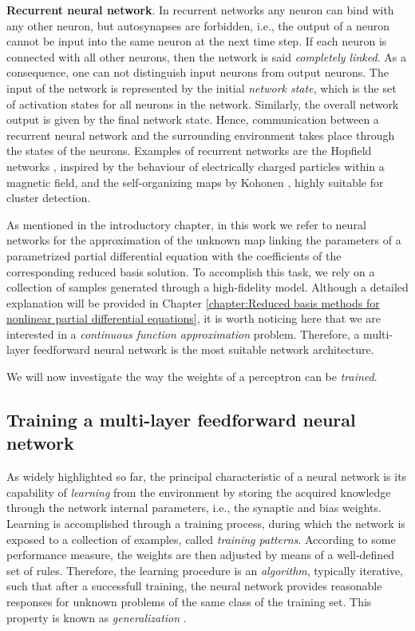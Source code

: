 \documentclass[12pt, a4paper, twoside, openright, notitlepage]{report}
\numberwithin{equation}{chapter}
\theoremstyle{theorem}
\theoremstyle{definition}
\theoremstyle{remark}
\theoremstyle{proposition}
\numberwithin{figure}{chapter}
\begin{document}
		\noindent \textbf{Recurrent neural network}. In recurrent networks any neuron can bind with any other neuron, but autosynapses are forbidden, i.e., the output of a neuron cannot be input into the same neuron at the next time step. If each neuron is connected with all other neurons, then the network is said \emph{completely linked}. As a consequence, one can not distinguish input neurons from output neurons. The input of the network is represented by the initial \emph{network state}, which is the set of activation states for all neurons in the network. Similarly, the overall network output is given by the final network state. Hence, communication between a recurrent neural network and the surrounding environment takes place through the states of the neurons. Examples of recurrent networks are the Hopfield networks \cite{Hop82}, inspired by the behaviour of electrically charged particles within a magnetic field, and the self-organizing maps by Kohonen \cite{Koh98}, highly suitable for cluster detection.
		
		\vspace*{0.3cm}
		
		As mentioned in the introductory chapter, in this work we refer to neural networks for the approximation of the unknown map linking the parameters of a parametrized partial differential equation with the coefficients of the corresponding reduced basis solution. To accomplish this task, we rely on a collection of samples generated through a high-fidelity model. Although a detailed explanation will be provided in Chapter \ref{chapter:Reduced basis methods for nonlinear partial differential equations}, it is worth noticing here that we are interested in a \emph{continuous function approximation} problem. Therefore, a multi-layer feedforward neural network is the most suitable network architecture. 
		
		We will now investigate the way the weights of a perceptron can be \emph{trained}.
		
	\vspace*{0.3cm}
		
	\subsection{Training a multi-layer feedforward neural network}
	\label{section:Training a multi-layer feedforward neural network}
	
		As widely highlighted so far, the principal characteristic of a neural network is its capability of \emph{learning} from the environment by storing the acquired knowledge through the network internal parameters, i.e., the synaptic and bias weights. Learning is accomplished through a training process, during which the network is exposed to a collection of examples, called \emph{training patterns}. According to some performance measure, the weights are then adjusted by means of a well-defined set of rules. Therefore, the learning procedure is an \emph{algorithm}, typically iterative, such that after a successfull training, the neural network provides reasonable responses for unknown problems of the same class of the training set. This property is known as \emph{generalization} \cite{Kri07}. 
		
\end{document}
